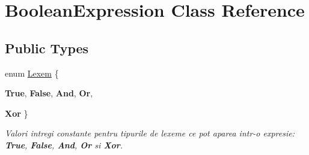 \hypertarget{classBooleanExpression}{
\section{BooleanExpression Class Reference}
\label{classBooleanExpression}
}
\subsection*{Public Types}
\begin{DoxyCompactItemize}
\item 
enum \hyperlink{classBooleanExpression_a299abbbf6a12738e2d9df792d50ccd76}{Lexem} \{ \par
{\bfseries True}, 
{\bfseries False}, 
{\bfseries And}, 
{\bfseries Or}, 
\par
{\bfseries Xor}
 \}
\begin{DoxyCompactList}\small\item\em Valori intregi constante pentru tipurile de lexeme ce pot aparea intr-\/o expresie: {\bfseries True}, {\bfseries False}, {\bfseries And}, {\bfseries Or} si {\bfseries Xor}. \item\end{DoxyCompactList}\end{DoxyCompactItemize}
